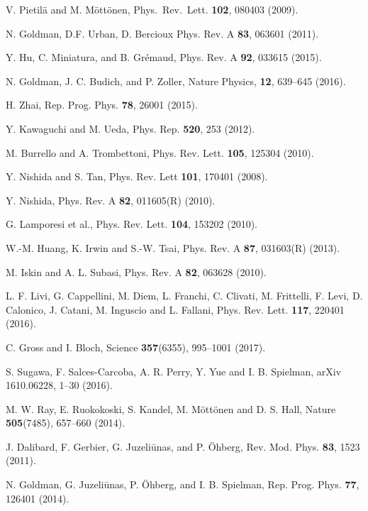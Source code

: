 \documentclass[aps,pra,showpacs,twocolumn,superscriptaddress]{revtex4-1}
\begin{document}
\begin{thebibliography}{11}
 V. Pietil\"a and M. M\"ott\"onen, Phys.~Rev.~Lett. \textbf{102}, 080403 (2009).

  N. Goldman, D.F. Urban, D. Bercioux Phys. Rev. A \textbf{83}, 063601 (2011).

 Y. Hu, C. Miniatura, and B. Grémaud,
 Phys. Rev. A \textbf{92}, 033615 (2015).
 
 N. Goldman, J. C. Budich, and P. Zoller, Nature Physics, \textbf{12}, 639–645 (2016).

 H. Zhai, Rep. Prog. Phys. \textbf{78}, 26001 (2015).
 
 Y. Kawaguchi and M. Ueda, Phys. Rep. \textbf{520}, 253 (2012).

 M. Burrello and A. Trombettoni, Phys. Rev. Lett. \textbf{105}, 125304 (2010).

 Y. Nishida and S. Tan, Phys. Rev. Lett \textbf{101}, 170401 (2008).

 Y. Nishida, Phys. Rev. A \textbf{82}, 011605(R) (2010).

 G. Lamporesi et al., Phys. Rev. Lett. \textbf{104}, 153202 (2010).

 W.-M. Huang, K. Irwin and S.-W. Tsai, Phys. Rev. A \textbf{87}, 031603(R) (2013).

 M. Iskin and A. L. Subasi, Phys. Rev. A \textbf{82}, 063628 (2010).

 L. F. Livi, G. Cappellini, M. Diem, L. Franchi, C. Clivati, M. Frittelli, F. Levi, D. Calonico, J. Catani, M. Inguscio and L. Fallani, Phys. Rev. Lett. \textbf{117}, 220401 (2016).

 C. Gross and I. Bloch, Science \textbf{357}(6355), 995–1001 (2017).

 S. Sugawa, F. Salces-Carcoba, A. R. Perry, Y. Yue and I. B. Spielman, arXiv 1610.06228, 1–30 (2016).

 M. W. Ray, E. Ruokokoski, S. Kandel, M. Möttönen and D. S. Hall, Nature \textbf{505}(7485), 657–660 (2014).

 J. Dalibard, F. Gerbier, G. Juzeli\=unas, 
and P. \"Ohberg, Rev. Mod. Phys. \textbf{83}, 1523 (2011).

 N. Goldman, G. Juzeli\={u}nas, P. Öhberg, 
and I. B. Spielman, Rep. Prog. Phys. \textbf{77}, 126401 (2014).


\end{thebibliography}
\end{document}
